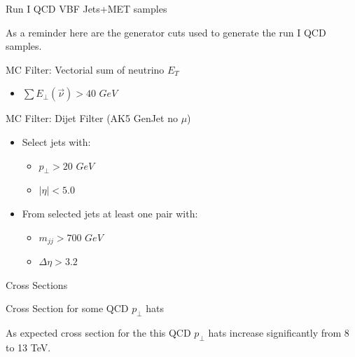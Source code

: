 \documentclass[8pt]{beamer}
\begin{document}
\appendix
\begin{frame}{Run I QCD VBF Jets+MET samples}

As a reminder here are the generator cuts used to generate the run I QCD samples.

\begin{block}{MC Filter: Vectorial sum of neutrino $E_T$}

\begin{itemize}
  \item $\sum E_\perp(\vec{\nu}) > 40$ $GeV$
\end{itemize}

\end{block}

\begin{block}{MC Filter: Dijet Filter (AK5 GenJet no $\mu$)}

\begin{itemize}
  \item Select jets with:
  \begin{itemize}
    \item $p_\perp>20$ $GeV$
    \item $|\eta|<5.0$
  \end{itemize}
  \item From selected jets at least one pair with:
  \begin{itemize}
    \item $m_{jj}>700$ $GeV$
    \item $\Delta\eta>3.2$
  \end{itemize}    
\end{itemize}

\end{block}

\end{frame}

\begin{frame}{Cross Sections}

\begin{block}{Cross Section for some QCD $p_\perp$ hats}
  


\end{block}
  
As expected cross section for the this QCD $p_\perp$ hats increase significantly from 8 to 13 TeV.
  
\end{frame}
\end{document}

